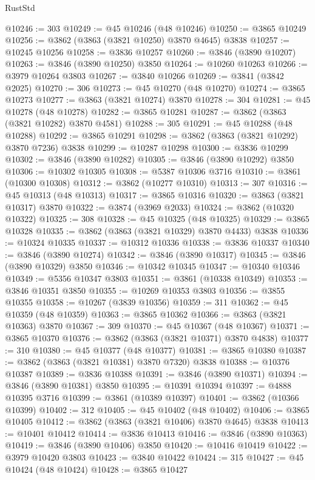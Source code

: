\begin{lexlean}{RustStd}
\begin{coremodule}
@10246 := 303
@10249 := @45 @10246 (@48 @10246)
@10250 := @3865 @10249
@10256 := @3862 (@3863 (@3821 @10250) @3870 @4645) @3838
@10257 := @10245 @10256
@10258 := @3836 @10257
@10260 := @3846 (@3890 @10207)
@10263 := @3846 (@3890 @10250) @3850
@10264 := @10260 @10263
@10266 := @3979 @10264 @3803
@10267 := @3840 @10266
@10269 := @3841 (@3842 @2025)
@10270 := 306
@10273 := @45 @10270 (@48 @10270)
@10274 := @3865 @10273
@10277 := @3863 (@3821 @10274) @3870
@10278 := 304
@10281 := @45 @10278 (@48 @10278)
@10282 := @3865 @10281
@10287 := @3862 (@3863 (@3821 @10282) @3870 @4581)
@10288 := 305
@10291 := @45 @10288 (@48 @10288)
@10292 := @3865 @10291
@10298 := @3862 (@3863 (@3821 @10292) @3870 @7236) @3838
@10299 := @10287 @10298
@10300 := @3836 @10299
@10302 := @3846 (@3890 @10282)
@10305 := @3846 (@3890 @10292) @3850
@10306 := @10302 @10305
@10308 := @5387 @10306 @3716
@10310 := @3861 (@10300 @10308)
@10312 := @3862 (@10277 @10310)
@10313 := 307
@10316 := @45 @10313 (@48 @10313)
@10317 := @3865 @10316
@10320 := @3863 (@3821 @10317) @3870
@10322 := @3874 (@3969 @2033)
@10324 := @3862 (@10320 @10322)
@10325 := 308
@10328 := @45 @10325 (@48 @10325)
@10329 := @3865 @10328
@10335 := @3862 (@3863 (@3821 @10329) @3870 @4433) @3838
@10336 := @10324 @10335
@10337 := @10312 @10336
@10338 := @3836 @10337
@10340 := @3846 (@3890 @10274)
@10342 := @3846 (@3890 @10317)
@10345 := @3846 (@3890 @10329) @3850
@10346 := @10342 @10345
@10347 := @10340 @10346
@10349 := @5356 @10347 @3803
@10351 := @3861 (@10338 @10349)
@10353 := @3846 @10351 @3850
@10355 := @10269 @10353 @3803
@10356 := @3855 @10355
@10358 := @10267 (@3839 @10356)
@10359 := 311
@10362 := @45 @10359 (@48 @10359)
@10363 := @3865 @10362
@10366 := @3863 (@3821 @10363) @3870
@10367 := 309
@10370 := @45 @10367 (@48 @10367)
@10371 := @3865 @10370
@10376 := @3862 (@3863 (@3821 @10371) @3870 @4838)
@10377 := 310
@10380 := @45 @10377 (@48 @10377)
@10381 := @3865 @10380
@10387 := @3862 (@3863 (@3821 @10381) @3870 @7320) @3838
@10388 := @10376 @10387
@10389 := @3836 @10388
@10391 := @3846 (@3890 @10371)
@10394 := @3846 (@3890 @10381) @3850
@10395 := @10391 @10394
@10397 := @4888 @10395 @3716
@10399 := @3861 (@10389 @10397)
@10401 := @3862 (@10366 @10399)
@10402 := 312
@10405 := @45 @10402 (@48 @10402)
@10406 := @3865 @10405
@10412 := @3862 (@3863 (@3821 @10406) @3870 @4645) @3838
@10413 := @10401 @10412
@10414 := @3836 @10413
@10416 := @3846 (@3890 @10363)
@10419 := @3846 (@3890 @10406) @3850
@10420 := @10416 @10419
@10422 := @3979 @10420 @3803
@10423 := @3840 @10422
@10424 := 315
@10427 := @45 @10424 (@48 @10424)
@10428 := @3865 @10427

\end{coremodule}
\end{lexlean}
